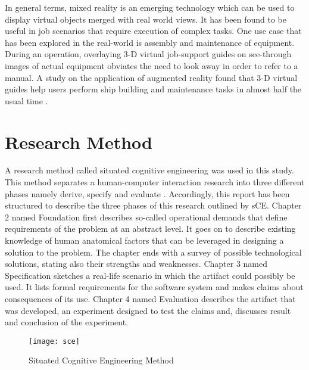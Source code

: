 
In general terms, mixed reality is an emerging technology which can be used to display virtual objects merged with real world views. It has been found to be useful in job scenarios that require execution of complex tasks. One use case that has been explored in the real-world is assembly and maintenance of equipment. During an operation, overlaying 3-D virtual job-support guides on see-through images of actual equipment obviates the need to look away in order to refer to a manual. A study on the application of augmented reality found that 3-D virtual guides help users perform ship building and maintenance tasks in almost half the usual time \parencite{henderson2011exploring}.



\section{Research Method}
A research method called situated cognitive engineering was used in this study. This method separates a human-computer interaction research into three different phases namely derive, specify and evaluate \parencite{neerincx2008situated}. Accordingly, this report has been structured to describe the three phases of this research outlined by sCE. Chapter 2 named Foundation first describes so-called operational demands that define requirements of the problem at an abstract level. It goes on to describe existing knowledge of human anatomical factors that can be leveraged in designing a solution to the problem. The chapter ends with a survey of possible technological solutions, stating also their strengths and weaknesses. Chapter 3 named Specification sketches a real-life scenario in which the artifact could possibly be used. It lists formal requirements for the software system and makes claims about consequences of its use. Chapter 4 named Evaluation describes the artifact that was developed, an experiment designed to test the claims and, discusses result and conclusion of the experiment. 

\begin{figure}
	\centering
	\texttt{[image: sce]}
	\caption{Situated Cognitive Engineering Method \parencite{neerincx2008situated}}
	\label{fig:augreal}
\end{figure}
